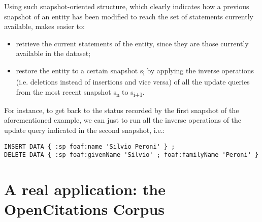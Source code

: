 \documentclass[runningheads,a4paper]{llncs}
\begin{document}
Using such snapshot-oriented structure, which clearly indicates how a previous snapshot of an entity has been modified to reach the set of statements currently available, makes easier to:
\begin{itemize}
\item retrieve the current statements of the entity, since they are those currently available in the dataset;
\item restore the entity to a certain snapshot s\textsubscript{i} by applying the inverse operations (i.e. deletions instead of insertions and vice versa) of all the update queries from the most recent snapshot s\textsubscript{n} to s\textsubscript{i+1}.
\end{itemize}

For instance, to get back to the status recorded by the first snapshot of the aforementioned example, we can just to run all the inverse operations of the update query indicated in the second snapshot, i.e.:

\begin{lstlisting}[mathescape]
INSERT DATA { :sp foaf:name 'Silvio Peroni' } ;
DELETE DATA { :sp foaf:givenName 'Silvio' ; foaf:familyName 'Peroni' }
\end{lstlisting}

\section{A real application: the OpenCitations Corpus}\label{__RefHeading__16814_1591320820}
\end{document}
